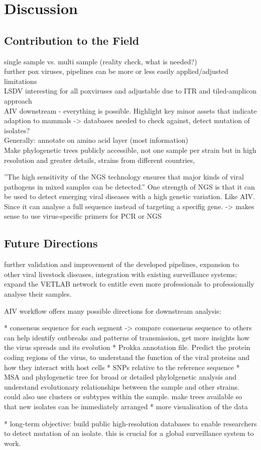 \chapter{Discussion}\label{chap:discussion}

\section{Contribution to the Field}
single sample vs. multi sample (reality check, what is needed?) \\
further pox viruses, pipelines can be more or less easily applied/adjusted \\
limitations \\
LSDV interesting for all poxviruses and adjustable due to ITR and tiled-amplicon approach \\
AIV downstream - everything is possible. Highlight key minor assets that indicate adaption to mammals -> databases needed to check against, detect mutation of isolates? \\
Generally: annotate on amino acid layer (most information) \\

Make phylogenetic trees publicly accessible, not one sample per strain but in high resolution and greater details, strains from different countries,

''The high sensitivity of the NGS technology ensures that major kinds of viral pathogens in mixed samples can be detected.''
One strength of NGS is that it can be used to detect emerging viral diseases with a high genetic variation. Like AIV. Since it can analyse a full sequence instead of targeting a specifig gene. -> makes sense to use virus-specific primers for PCR or NGS 

\section{Future Directions}
further validation and improvement of the developed pipelines, expansion to other viral livestock diseases, integration with existing surveillance systems; expand the VETLAB network to entitle even more professionals to professionally analyse their samples.

AIV workflow offers many possible directions for downstream analysis:

* consensus sequence for each segment -> compare consensus sequence to others can help identify outbreaks and patterns of transmission, get more insights how the virus spreads and its evolution
* Prokka annotation file. Predict the protein coding regions of the virus, to understand the function of the viral proteins and how they interact with host cells
* SNPs relative to the reference sequence
* MSA and phylogenetic tree for broad or detailed phylolgenetic analysis and understand evolutionary relationships between the sample and other strains. could also use clusters or subtypes within the sample. make trees available so that new isolates can be immediately arranged
* more visualisation of the data

* long-term objective: build public high-resolution databases to enable researchers to detect mutation of an isolate. this is crucial for a global surveillance system to work.
